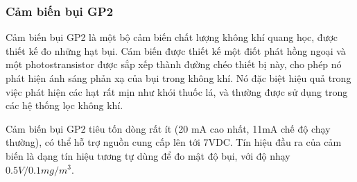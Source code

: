\subsubsection*{Cảm biến bụi GP2} 
Cảm biến bụi GP2 là một bộ cảm biến chất lượng không khí quang học, được thiết kế đo những hạt bụi. Cám biến được thiết kế một điốt phát hồng ngoại và một photostransistor được sắp xếp thành đường chéo thiết bị này, cho phép nó phát hiện ánh sáng phản xạ của bụi trong không khí.  Nó đặc biệt hiệu quả trong việc phát hiện các hạt rất mịn như khói thuốc lá, và thường được sử dụng trong các hệ thống lọc không khí.

Cảm biến bụi GP2 tiêu tốn dòng rất ít (20 mA cao nhất, 11mA chế độ chạy thường), có thể hỗ trợ nguồn cung cấp lên tới 7VDC. Tín hiệu đầu ra của cảm biến là dạng tín hiệu tương tự dùng để đo mật độ bụi, với độ nhạy $0.5V/0.1mg/{m}^{3}$.

